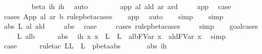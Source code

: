 \begin{isabellebody}
\ \ \ \ \ \ \isamarkupfalse%
\ {}\ beta\ ih\ ih{}\ \isamarkupfalse%
\ auto\isanewline
\ \ \ \ \isamarkupfalse%
\isanewline
\ \ \isamarkupfalse%
\isanewline
{}\isamarkupfalse%
\isanewline
{}\isamarkupfalse%
\ {\isacharparenleft}app\ al\ ald\ ar\ ard{\isacharparenright}\ \isanewline
\ \ \isamarkupfalse%
\ app{\isacharparenleft}{}{\isacharcomma}{}{\isacharcomma}{}{\isacharparenright}\ \isamarkupfalse%
\ {\isacharquery}case\isanewline
\ \ \isamarkupfalse%
\ {\isacharparenleft}cases\ {\isachardoublequoteopen}App\ al\ ar{\isachardoublequoteclose}\ b\ rule{\isacharcolon}pbeta{\isachardot}cases{\isacharparenright}\isanewline
\ \ \isamarkupfalse%
\ app\ \isamarkupfalse%
\ auto{\isacharbrackleft}{}{\isacharbrackright}\isanewline
\ \ \isamarkupfalse%
\ simp\isanewline
\ \ \isamarkupfalse%
\ simp\isanewline
{}\isamarkupfalse%
\isanewline
{}\isamarkupfalse%
\ {\isacharparenleft}abs\ L\ al\ ald{\isacharparenright}\ \isanewline
\ \ \isamarkupfalse%
\ abs{\isacharparenleft}{}{\isacharparenright}\ \isamarkupfalse%
\ {\isacharquery}case\ \isanewline
\ \ \isamarkupfalse%
\ {\isacharparenleft}cases\ rule{\isacharcolon}pbeta{\isachardot}cases{\isacharparenright}\ \isanewline
\ \ \isamarkupfalse%
\ simp\isanewline
\ \ \isamarkupfalse%
\ goal{\isacharunderscore}cases\isanewline
\ \ \isamarkupfalse%
\ {\isacharparenleft}{}\ L{\isacharprime}\ alb{\isacharparenright}\isanewline
\ \ \ \ \isamarkupfalse%
\ abs\ \isamarkupfalse%
\ ih{\isacharcolon}\ {\isachardoublequoteopen}{\isasymAnd}x{\isachardot}\ x\ {\isasymnotin}\ L\ {\isasymunion}\ L{\isacharprime}\ {\isasymLongrightarrow}\ alb{\isacharcircum}FVar\ x\ {\isasymggreater}\ ald{\isacharcircum}FVar\ x{\isachardoublequoteclose}\ \isamarkupfalse%
\ simp\isanewline
\ \ \ \ \isamarkupfalse%
\ {\isacharquery}case\isanewline
\ \ \ \ \isamarkupfalse%
\ {\isacharparenleft}rule{\isacharunderscore}tac\ L{\isacharequal}{\isachardoublequoteopen}L\ {\isasymunion}\ L{\isacharprime}{\isachardoublequoteclose}\ \ pbeta{\isachardot}abs{\isacharparenright}\isanewline
\ \ \ \ \isamarkupfalse%
\ {}\ abs\ ih\ \isamarkupfalse%

\end{isabellebody}
